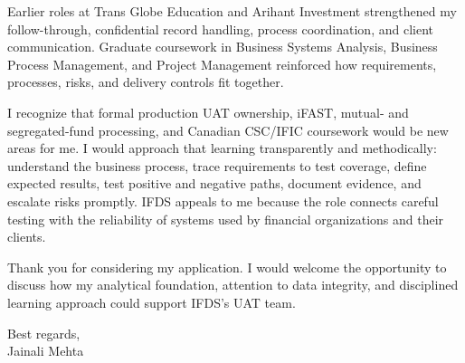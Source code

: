 \documentclass[letterpaper,11pt]{article}
\begin{document}
\bigbreak
Earlier roles at Trans Globe Education and Arihant Investment strengthened my follow-through, confidential record handling, process coordination, and client communication. Graduate coursework in Business Systems Analysis, Business Process Management, and Project Management reinforced how requirements, processes, risks, and delivery controls fit together.

\bigbreak
I recognize that formal production UAT ownership, iFAST, mutual- and segregated-fund processing, and Canadian CSC/IFIC coursework would be new areas for me. I would approach that learning transparently and methodically: understand the business process, trace requirements to test coverage, define expected results, test positive and negative paths, document evidence, and escalate risks promptly. IFDS appeals to me because the role connects careful testing with the reliability of systems used by financial organizations and their clients.

\bigbreak
Thank you for considering my application. I would welcome the opportunity to discuss how my analytical foundation, attention to data integrity, and disciplined learning approach could support IFDS's UAT team.

\bigbreak
Best regards,\\
Jainali Mehta
\end{document}
